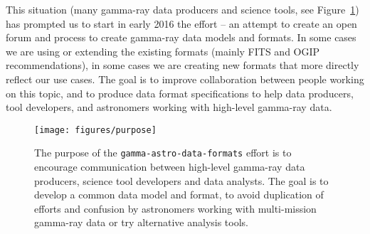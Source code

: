 This situation (many gamma-ray data producers and science tools, see Figure~\ref{fig:purpose}) has prompted us to start in early 2016 the \gadf effort -- an attempt to create an open forum and process to create gamma-ray data models and formats. In some cases we are using or extending the existing formats (mainly FITS and OGIP recommendations), in some cases we are creating new formats that more directly reflect our use cases. The goal is to improve collaboration between people working on this topic, and to produce data format specifications to help data producers, tool developers, and astronomers working with high-level gamma-ray data.

\begin{figure}[tb]
\centerline{\texttt{[image: figures/purpose]}}
\caption{
The purpose of the \texttt{gamma-astro-data-formats} effort is to encourage communication between high-level gamma-ray data producers, science tool developers and data analysts. The goal is to develop a common data model and format, 
to avoid duplication of efforts and confusion by astronomers working with multi-mission gamma-ray data or try alternative analysis tools.
}
\label{fig:purpose}
\end{figure}


